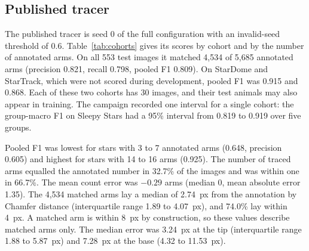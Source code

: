 \subsection*{Published tracer}

The published tracer is seed 0 of the full configuration with an invalid-seed threshold of 0.6.
Table~\ref{tab:cohorts} gives its scores by cohort and by the number of annotated arms.
On all 553 test images it matched 4,534 of 5,685 annotated arms (precision 0.821, recall 0.798, pooled F1 0.809).
On StarDome and StarTrack, which were not scored during development, pooled F1 was 0.915 and 0.868.
Each of these two cohorts has 30 images, and their test animals may also appear in training.
The campaign recorded one interval for a single cohort: the group-macro F1 on Sleepy Stars had a 95\% interval from 0.819 to 0.919 over five groups.

Pooled F1 was lowest for stars with 3 to 7 annotated arms (0.648, precision 0.605) and highest for stars with 14 to 16 arms (0.925).
The number of traced arms equalled the annotated number in 32.7\% of the images and was within one in 66.7\%.
The mean count error was $-0.29$ arms (median 0, mean absolute error 1.35).
The 4,534 matched arms lay a median of 2.74~px from the annotation by Chamfer distance (interquartile range 1.89 to 4.07~px), and 74.0\% lay within 4~px.
A matched arm is within 8~px by construction, so these values describe matched arms only.
The median error was 3.24~px at the tip (interquartile range 1.88 to 5.87~px) and 7.28~px at the base (4.32 to 11.53~px).

